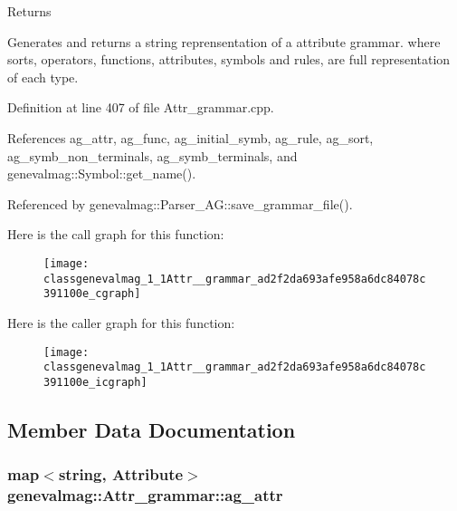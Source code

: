 \begin{DoxyReturn}{Returns}

\end{DoxyReturn}
Generates and returns a string reprensentation of a attribute grammar. where sorts, operators, functions, attributes, symbols and rules, are full representation of each type. 

Definition at line 407 of file Attr\_\-grammar.cpp.



References ag\_\-attr, ag\_\-func, ag\_\-initial\_\-symb, ag\_\-rule, ag\_\-sort, ag\_\-symb\_\-non\_\-terminals, ag\_\-symb\_\-terminals, and genevalmag::Symbol::get\_\-name().



Referenced by genevalmag::Parser\_\-AG::save\_\-grammar\_\-file().



Here is the call graph for this function:\nopagebreak
\begin{figure}[H]
\begin{center}
\leavevmode
\texttt{[image: classgenevalmag\_1\_1Attr\_\_grammar\_ad2f2da693afe958a6dc84078c391100e\_cgraph]}
\end{center}
\end{figure}




Here is the caller graph for this function:\nopagebreak
\begin{figure}[H]
\begin{center}
\leavevmode
\texttt{[image: classgenevalmag\_1\_1Attr\_\_grammar\_ad2f2da693afe958a6dc84078c391100e\_icgraph]}
\end{center}
\end{figure}




\subsection{Member Data Documentation}
\hypertarget{classgenevalmag_1_1Attr__grammar_af8eda41983da416b71568b230495cac3}{
\subsubsection[{ag\_\-attr}]{\setlength{\rightskip}{0pt plus 5cm}map$<$string, {\bf Attribute}$>$ {\bf genevalmag::Attr\_\-grammar::ag\_\-attr}}}
\label{classgenevalmag_1_1Attr__grammar_af8eda41983da416b71568b230495cac3}


